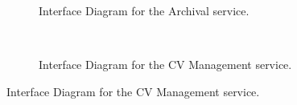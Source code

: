 \documentclass[12pt]{article}
\begin{document}
\begin{figure}[H]
\begin{subfigure}[p]{0.47\textwidth}
\centering	
{}
\caption{Interface Diagram for the Archival service.}
\end{subfigure}
~
\begin{subfigure}[p]{0.47\textwidth}
\centering	
{}
\caption{Interface Diagram for the CV Management service.}
\end{subfigure}


\end{figure}
\end{document}
